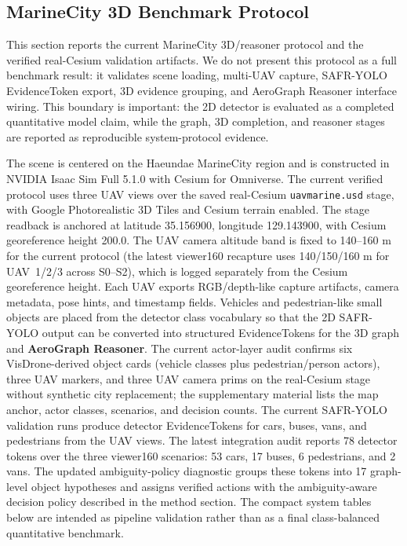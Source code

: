\subsection{MarineCity 3D Benchmark Protocol}
\label{sec:marinecity_3d_protocol}

This section reports the current MarineCity 3D/reasoner protocol and the
verified real-Cesium validation artifacts. We do not present this protocol as a
full benchmark result: it validates scene loading, multi-UAV capture,
SAFR-YOLO EvidenceToken export, 3D evidence grouping, and AeroGraph Reasoner
interface wiring. This boundary is important: the 2D detector is evaluated as a
completed quantitative model claim, while the graph, 3D completion, and
reasoner stages are reported as reproducible system-protocol evidence.

The scene is centered on the Haeundae MarineCity region and is constructed in
NVIDIA Isaac Sim Full 5.1.0 with Cesium for Omniverse. The current verified
protocol uses three UAV views over the saved real-Cesium \texttt{uavmarine.usd}
stage, with Google Photorealistic 3D Tiles and Cesium terrain enabled. The
stage readback is anchored at latitude 35.156900, longitude 129.143900, with
Cesium georeference height 200.0. The UAV camera altitude band is fixed to
140--160 m for the current protocol (the latest viewer160 recapture uses
140/150/160 m for UAV~1/2/3 across S0--S2), which is logged separately from the
Cesium georeference height. Each UAV exports
RGB/depth-like capture artifacts, camera metadata, pose hints, and timestamp
fields. Vehicles and pedestrian-like small objects are placed from the detector
class vocabulary so that the 2D SAFR-YOLO output can be converted into
structured EvidenceTokens for the 3D graph and \textbf{AeroGraph Reasoner}.
The current actor-layer audit confirms six VisDrone-derived object cards
(vehicle classes plus pedestrian/person actors), three UAV markers, and three
UAV camera prims on the real-Cesium stage without synthetic city replacement;
the supplementary material lists the map anchor, actor classes, scenarios, and
decision counts.
The current SAFR-YOLO validation runs produce detector EvidenceTokens for cars,
buses, vans, and pedestrians from the UAV views. The latest integration audit
reports 78 detector tokens over the three viewer160 scenarios: 53 cars, 17
buses, 6 pedestrians, and 2 vans. The updated ambiguity-policy diagnostic groups
these tokens into 17 graph-level object hypotheses and assigns verified actions
with the ambiguity-aware decision policy described in the method section. The compact
system tables below are intended as pipeline validation rather than as a final
class-balanced quantitative benchmark.

